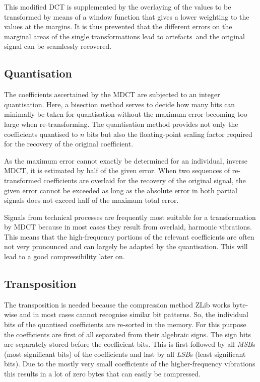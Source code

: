 \documentclass[a4paper,12pt,BCOR6mm,bibtotoc,idxtotoc]{scrbook}
\begin{document}
This modified DCT is supplemented by the overlaying of the values to be transformed by means of a window function that gives a lower weighting to the values at the margins. It is thus prevented that the different errors on the marginal areas of the single transformations lead to \glqq artefacts\grqq\  and the original signal can be seamlessly recovered.

\subsection{Quantisation}

The coefficients ascertained by the MDCT are subjected to an integer quantisation. Here, a bisection method serves to decide how many bits can minimally be taken for quantisation without the maximum error becoming too large when re-transforming. The quantisation method provides not only the coefficients quantised to $n$ bits but also the floating-point scaling factor required for the recovery of the original coefficient.

As the maximum error cannot exactly be determined for an individual, inverse MDCT, it is estimated by half of the given error. When two sequences of re-transformed coefficients are overlaid for the recovery of the original signal, the given error cannot be exceeded as long as the absolute error in both partial signals does not exceed half of the maximum total error.

Signals from technical processes are frequently most suitable for a transformation by MDCT because in most cases they result from overlaid, harmonic vibrations. This means that the high-frequency portions of the relevant coefficients are often not very pronounced and can largely be adapted by the quantisation. This will lead to a good compressibility later on.

\subsection{Transposition} \label{sec:comp_mdct_trans}

The transposition is needed because the compression method ZLib works byte-wise and in most cases cannot recognise similar bit patterns. So, the individual bits of the quantised coefficients are re-sorted in the memory. For this purpose the coefficients are first of all separated from their algebraic signs. The sign bits are separately stored before the coefficient bits. This is first followed by all \textit{MSB}s (\glqq most significant bits\grqq) of the coefficients and last by all \textit{LSB}s (\glqq least significant bits\grqq). Due to the mostly very small coefficients of the higher-frequency vibrations this results in a lot of zero bytes that can easily be compressed.
\end{document}
